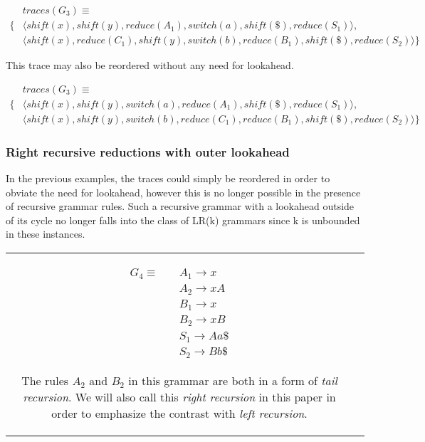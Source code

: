 \documentclass[a4paper,11pt]{article}
\begin{document}
\parbox{.3\textwidth}{\begin{align*}
&traces(G_3) \equiv \\
\{ & \langle shift(x), shift(y), reduce(A_1), switch(a), shift(\$), reduce(S_1) \rangle,\\
   & \langle shift(x), reduce(C_1), shift(y), switch(b), reduce(B_1), shift(\$), reduce(S_2) \rangle \}
\end{align*}}

This trace may also be reordered without any need for lookahead.

\parbox{.3\textwidth}{\begin{align*}
&traces(G_3) \equiv \\
\{ & \langle shift(x), shift(y), switch(a), reduce(A_1), shift(\$), reduce(S_1) \rangle,\\
   & \langle shift(x), shift(y), switch(b), reduce(C_1), reduce(B_1), shift(\$), reduce(S_2) \rangle \}
\end{align*}}

\subsubsection{Right recursive reductions with outer lookahead}
In the previous examples, the traces could simply be reordered in order to obviate the need for lookahead, however this is no longer possible in the presence of recursive grammar rules.
Such a recursive grammar with a lookahead outside of its cycle no longer falls into the class of LR(k) grammars since k is unbounded in these instances.

\begin{tabular}[t]{cl}
\parbox{.3\textwidth}{
\begin{align*}
G_4 \equiv \quad & A_1 \rightarrow x\\
                 & A_2 \rightarrow x A\\
                 & B_1 \rightarrow x\\
                 & B_2 \rightarrow x B\\
                 & S_1 \rightarrow A a \$\\
                 & S_2 \rightarrow B b \$
\end{align*}}
\parbox{.8\textwidth}{The rules $A_2$ and $B_2$ in this grammar are both in a form of \emph{tail recursion}. 
We will also call this \emph{right recursion} in this paper in order to emphasize the contrast with \emph{left recursion}.}
\end{tabular}
\end{document}
